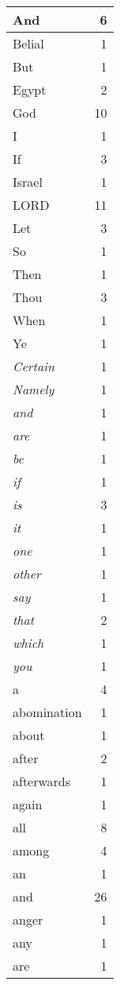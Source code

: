 \begin{center}
\begin{longtable}{l|r}
\hline \hline
\endlastfoot
And & 6 \\ \hline
Belial & 1 \\ \hline
But & 1 \\ \hline
Egypt & 2 \\ \hline
God & 10 \\ \hline
I & 1 \\ \hline
If & 3 \\ \hline
Israel & 1 \\ \hline
LORD & 11 \\ \hline
Let & 3 \\ \hline
So & 1 \\ \hline
Then & 1 \\ \hline
Thou & 3 \\ \hline
When & 1 \\ \hline
Ye & 1 \\ \hline
\emph{Certain} & 1 \\ \hline
\emph{Namely} & 1 \\ \hline
\emph{and} & 1 \\ \hline
\emph{are} & 1 \\ \hline
\emph{be} & 1 \\ \hline
\emph{if} & 1 \\ \hline
\emph{is} & 3 \\ \hline
\emph{it} & 1 \\ \hline
\emph{one} & 1 \\ \hline
\emph{other} & 1 \\ \hline
\emph{say} & 1 \\ \hline
\emph{that} & 2 \\ \hline
\emph{which} & 1 \\ \hline
\emph{you} & 1 \\ \hline
a & 4 \\ \hline
abomination & 1 \\ \hline
about & 1 \\ \hline
after & 2 \\ \hline
afterwards & 1 \\ \hline
again & 1 \\ \hline
all & 8 \\ \hline
among & 4 \\ \hline
an & 1 \\ \hline
and & 26 \\ \hline
anger & 1 \\ \hline
any & 1 \\ \hline
are & 1 \\ \hline

\end{longtable}
\end{center}
